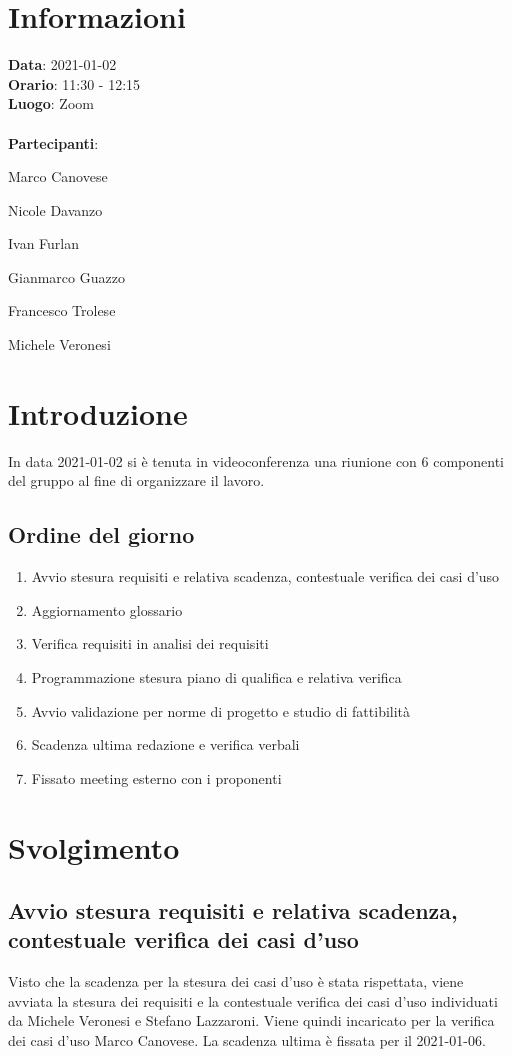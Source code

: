 \section{Informazioni}
\textbf{Data}: 2021-01-02\\
\textbf{Orario}: 11:30 - 12:15\\
\textbf{Luogo}: Zoom\\\\
\textbf{Partecipanti}:\begin{list}{*}{\setlength{\itemsep}{0cm}}
	\item Marco Canovese
	\item Nicole Davanzo
	\item Ivan Furlan
	\item Gianmarco Guazzo
	\item Francesco Trolese
	\item Michele Veronesi
\end{list}

\section{Introduzione}
In data 2021-01-02 si è tenuta in videoconferenza una riunione con 6 componenti del gruppo al fine di organizzare il lavoro.

\subsection{Ordine del giorno}
\begin{enumerate}
    \item Avvio stesura requisiti e relativa scadenza, contestuale verifica dei casi d'uso
    \item Aggiornamento glossario
    \item Verifica requisiti in analisi dei requisiti
    \item Programmazione stesura piano di qualifica e relativa verifica
    \item Avvio validazione per norme di progetto e studio di fattibilità
    \item Scadenza ultima redazione e verifica verbali
    \item Fissato meeting esterno con i proponenti
\end{enumerate}

\section{Svolgimento}
\subsection{Avvio stesura requisiti e relativa scadenza, contestuale verifica dei casi d'uso}
Visto che la scadenza per la stesura dei casi d'uso è stata rispettata, viene avviata la stesura dei requisiti
e la contestuale verifica dei casi d'uso individuati da Michele Veronesi e Stefano Lazzaroni.
Viene quindi incaricato per la verifica dei casi d'uso Marco Canovese.
La scadenza ultima è fissata per il 2021-01-06.

